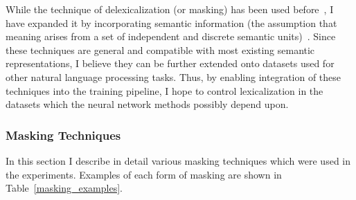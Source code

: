 \documentclass{article}
\begin{document}
While the technique of delexicalization (or masking) has been used before~\citep*{zeman2008cross}, I have expanded it by incorporating semantic information (the assumption that meaning arises from a set of independent and discrete semantic units)~\citep*{peyrard2019simple}. Since these techniques are general and compatible with most existing semantic representations, I believe they can be further extended onto datasets used for other natural language processing tasks. Thus, by enabling integration of these techniques into the training pipeline, I hope to control lexicalization in the datasets which the neural network methods possibly depend upon. 



\subsubsection{Masking Techniques} \label{masking_techniques}
In this section I describe in detail various masking techniques which were used in the experiments. Examples of each form of masking are shown in Table~\ref{masking_examples}.
\end{document}
